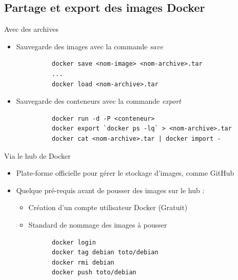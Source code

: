 \documentclass{beamer}
\begin{document}
    \subsection{Partage et export des images Docker}
    \begin{frame}[containsverbatim]{Avec des archives}
       \begin{itemize}
          \item{Sauvegarde des images avec la commande \em{save}}
       \end{itemize}
       
        \begin{exampleblock}
          \begin{verbatim}
             docker save <nom-image> <nom-archive>.tar
             ...
             docker load <nom-archive>.tar
          \end{verbatim}
       \end{exampleblock}

       \begin{itemize}
          \item{Sauvegarde des conteneurs avec la commande \em{export}}
       \end{itemize}

       \begin{exampleblock}
          \begin{verbatim}
             docker run -d -P <conteneur>
             docker export `docker ps -lq` > <nom-archive>.tar
             docker cat <nom-archive>.tar | docker import -
          \end{verbatim}
       \end{exampleblock}
    \end{frame}

    \begin{frame}[containsverbatim]{Via le hub de Docker}
       \begin{itemize}
          \item{Plate-forme officielle pour gérer le stockage d'images, comme GitHub}
          \item{Quelque pré-requis avant de pousser des images sur le hub :}
             \begin{itemize}
                \item{Création d'un compte utilisateur Docker (Gratuit)}
                \item{Standard de nommage des images à pousser}
             \end{itemize}
       \end{itemize}
       
       \begin{exampleblock}
          \begin{verbatim}
             docker login
             docker tag debian toto/debian
             docker rmi debian
             docker push toto/debian
          \end{verbatim}
       \end{exampleblock}
    \end{frame}
\end{document}
